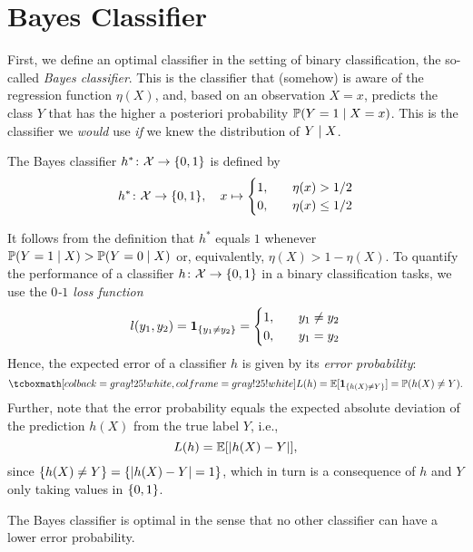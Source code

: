 \section{Bayes Classifier}

First, we define an optimal classifier in the setting of binary classification, the so-called \emph{Bayes classifier}. This is the classifier that (somehow) is aware of the regression function $\eta(X)$, and, based on an observation $X = x$, predicts the class $Y$ that has the higher a posteriori probability $\mathbb{P}(Y = 1 \mathrel{|} X = x)$. This is the classifier we \emph{would} use \emph{if} we knew the distribution of $Y \mathrel{|} X$.

\begin{definition}
The Bayes classifier $h^* \colon \mathcal{X} \to \set{0,1}$ is defined by
\[
    h^* \colon \mathcal{X} \to \set{0, 1}, \quad x \mapsto \begin{cases}
        1, \quad & \eta(x) > 1/2 \\
        0, \quad & \eta(x) \leq 1/2
    \end{cases}
\]
\end{definition}

It follows from the definition that $h^*$ equals $1$ whenever $\mathbb{P}(Y = 1 \mathrel{|} X) > \mathbb{P}(Y = 0 \mathrel{|} X)$ or, equivalently, $\eta(X) > 1 - \eta(X)$. To quantify the performance of a classifier $h \colon \mathcal{X} \to \set{0, 1}$ in a binary classification tasks, we use the \emph{$0$-$1$ loss function}
\[
    l(y_1, y_2) = \indSet{y_1 \neq y_2} = \begin{cases}
        1, \quad & y_1 \neq y_2 \\
        0, \quad & y_1 = y_2
    \end{cases}
\]
Hence, the expected error of a classifier $h$ is given by its \emph{error probability}:
\[
    \highlightMath{
        L(h) = \Exp[\indSet{h(X) \neq Y}] = \P(h(X) \neq Y).
    }
\]
Further, note that the error probability equals the expected absolute deviation of the prediction $h(X)$ from the true label $Y$, i.e.,
\[
    L(h) = \operatorname{\mathbb{E}}[\abs{h(X) - Y}],
\]
since $\set{h(X) \neq Y} = \set{\abs{h(X) - Y} = 1}$, which in turn is a consequence of $h$ and $Y$ only taking values in $\set{0, 1}$.

The Bayes classifier is optimal in the sense that no other classifier can have a lower error probability.

